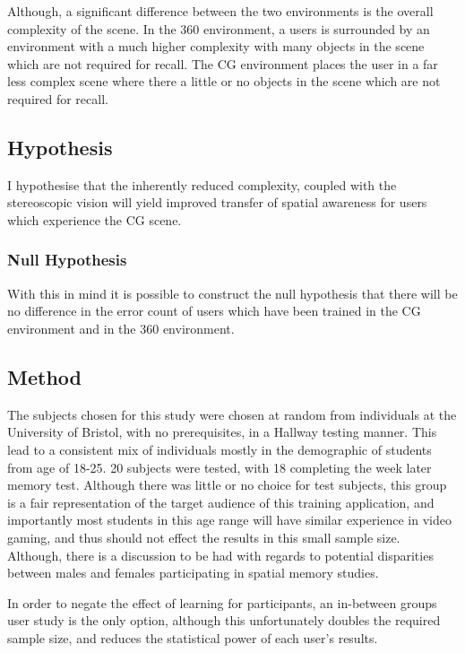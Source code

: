 \documentclass[ %
                    author={Elis Jones},
                supervisor={Dr. Kirsten Cater},
                    degree={BSc},
                     title={The Effect of Presentation Medium on Spatial Cognition},
                  subtitle={in the Virtual Environment},
                      year={2018} ]{dissertation}
\begin{document}
Although, a significant difference between the two environments is the overall complexity of the scene. In the 360 environment, a users is surrounded by an environment with a much higher complexity with many objects in the scene which are not required for recall. The CG environment places the user in a far less complex scene where there a little or no objects in the scene which are not required for recall.

\subsection{Hypothesis}\label{hypothesis}
I hypothesise that the inherently reduced complexity, coupled with the stereoscopic vision will yield improved transfer of spatial awareness for users which experience the CG scene.

\subsubsection{Null Hypothesis}
With this in mind it is possible to construct the null hypothesis that there will be no difference in the error count of users which have been trained in the CG environment and in the 360 environment.


\subsection{Method}\label{cantab}
The subjects chosen for this study were chosen at random from individuals at the University of Bristol, with no prerequisites, in a Hallway testing manner. This lead to a consistent mix of individuals mostly in the demographic of students from age of 18-25. 20 subjects were tested, with 18 completing the week later memory test. Although there was little or no choice for test subjects, this group is a fair representation of the target audience of this training application, and importantly most students in this age range will have similar experience in video gaming, and thus should not effect the results in this small sample size. Although, there is a discussion to be had with regards to potential disparities between males and females participating in spatial memory studies. 

In order to negate the effect of learning for participants, an in-between groups user study is the only option, although this unfortunately doubles the required sample size, and reduces the statistical power of  each user's results. 
\end{document}
